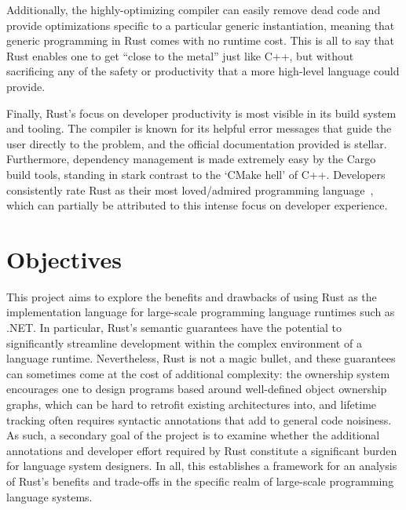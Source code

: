 Additionally, the highly-optimizing compiler can easily remove dead code and provide optimizations specific to a particular generic instantiation,
meaning that generic programming in Rust comes with no runtime cost.
This is all to say that Rust enables one to get ``close to the metal'' just like C++,
but without sacrificing any of the safety or productivity that a more high-level language could provide.

Finally, Rust's focus on developer productivity is most visible in its build system and tooling.
The compiler is known for its helpful error messages that guide the user directly to the problem, and the official documentation provided is stellar.
Furthermore, dependency management is made extremely easy by the Cargo build tools,
standing in stark contrast to the `CMake hell' of C++.
Developers consistently rate Rust as their most loved/admired programming language~\cite{sosurvey},
which can partially be attributed to this intense focus on developer experience.

\section{Objectives}
This project aims to explore the benefits and drawbacks of using Rust as the implementation language for large-scale
programming language runtimes such as .NET.
In particular, Rust's semantic guarantees have the potential to significantly streamline development within the
complex environment of a language runtime.
Nevertheless, Rust is not a magic bullet, and these guarantees can sometimes come at the cost of additional complexity:
the ownership system encourages one to design programs based around well-defined object ownership graphs,
which can be hard to retrofit existing architectures into,
and lifetime tracking often requires syntactic annotations that add to general code noisiness.
As such, a secondary goal of the project is to examine whether the additional annotations and developer effort
required by Rust constitute a significant burden for language system designers.
In all, this establishes a framework for an analysis of Rust's benefits and trade-offs in the specific realm of large-scale programming language systems.
